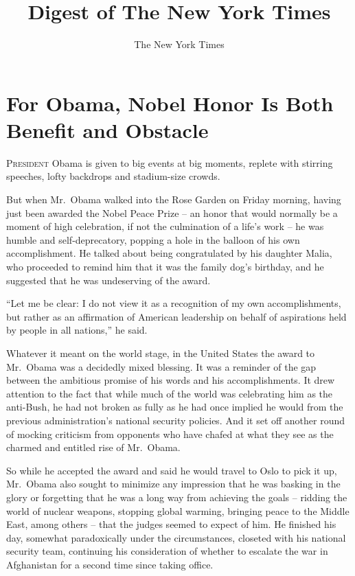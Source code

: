 ﻿\documentclass[12pt]{article}
\title{Digest of The New York Times}
\author{The New York Times}
\begin{document}
\date{}
\thispagestyle{empty}
\renewcommand\contentsname{\textsf{Digest of The New York Times}}
{\footnotesize\textsf{\tableofcontents}}
\clearpage
\setcounter{page}{1}

\section{For Obama, Nobel Honor Is Both Benefit and Obstacle}

\lettrine{P}{resident} Obama is given to big events at big moments, replete
with stirring speeches, lofty backdrops and stadium-size crowds.

But when Mr.~Obama walked into the Rose Garden on Friday morning, having just been awarded the Nobel
Peace Prize -- an honor that would normally be a moment of high celebration, if not the culmination
of a life's work -- he was humble and self-deprecatory, popping a hole in the balloon of his own
accomplishment. He talked about being congratulated by his daughter Malia, who proceeded to remind
him that it was the family dog's birthday, and he suggested that he was undeserving of the award.

``Let me be clear: I do not view it as a recognition of my own accomplishments, but rather as an
affirmation of American leadership on behalf of aspirations held by people in all nations,'' he
said.

Whatever it meant on the world stage, in the United States the award to Mr.~Obama was a decidedly
mixed blessing. It was a reminder of the gap between the ambitious promise of his words and his
accomplishments. It drew attention to the fact that while much of the world was celebrating him as
the anti-Bush, he had not broken as fully as he had once implied he would from the previous
administration's national security policies. And it set off another round of mocking\cite{mock}
criticism from opponents who have chafed at what they see as the charmed and entitled rise of
Mr.~Obama.

So while he accepted the award and said he would travel to Oslo to pick it up, Mr.~Obama also sought
to minimize any impression that he was basking in the glory or forgetting that he was a long way
from achieving the goals -- ridding the world of nuclear weapons, stopping global warming, bringing
peace to the Middle East, among others -- that the judges seemed to expect of him. He finished his
day, somewhat paradoxically under the circumstances, closeted with his national security team,
continuing his consideration of whether to escalate the war in Afghanistan for a second time since
taking office.
\end{document}
